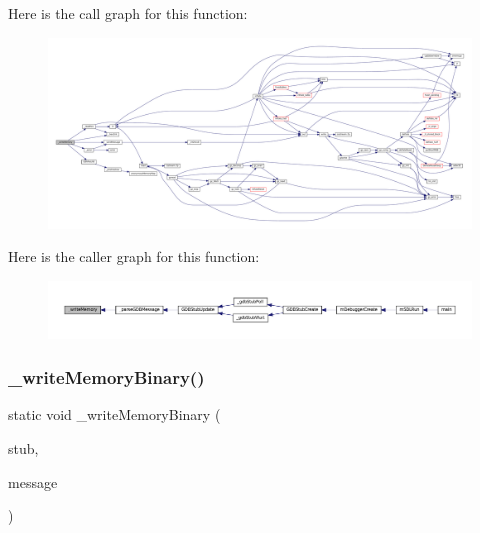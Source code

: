 Here is the call graph for this function\+:
\nopagebreak
\begin{figure}[H]
\begin{center}
\leavevmode
\includegraphics[width=350pt]{gdb-stub_8c_a4e6946316c1b882a919c3839f12b6c85_cgraph}
\end{center}
\end{figure}
Here is the caller graph for this function\+:
\nopagebreak
\begin{figure}[H]
\begin{center}
\leavevmode
\includegraphics[width=350pt]{gdb-stub_8c_a4e6946316c1b882a919c3839f12b6c85_icgraph}
\end{center}
\end{figure}
\mbox{\label{gdb-stub_8c_a57b8f62dd442a177c1cca999ec2010a4}} 
\subsubsection{\texorpdfstring{\+\_\+write\+Memory\+Binary()}{\_writeMemoryBinary()}}
{\footnotesize\ttfamily static void \+\_\+write\+Memory\+Binary (\begin{DoxyParamCaption}\item[{struct G\+D\+B\+Stub $\ast$}]{stub,  }\item[{const char $\ast$}]{message }\end{DoxyParamCaption})\hspace{0.3cm}{\ttfamily [static]}}

